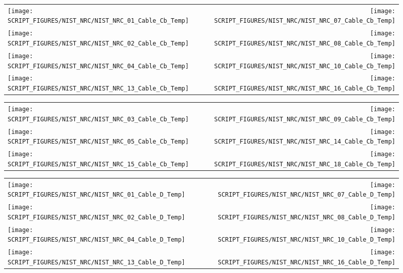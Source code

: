 \begin{figure}[p]
\begin{tabular*}{\textwidth}{l@{\extracolsep{\fill}}r}
\texttt{[image: SCRIPT\_FIGURES/NIST\_NRC/NIST\_NRC\_01\_Cable\_Cb\_Temp]} &
\texttt{[image: SCRIPT\_FIGURES/NIST\_NRC/NIST\_NRC\_07\_Cable\_Cb\_Temp]} \\
\texttt{[image: SCRIPT\_FIGURES/NIST\_NRC/NIST\_NRC\_02\_Cable\_Cb\_Temp]} &
\texttt{[image: SCRIPT\_FIGURES/NIST\_NRC/NIST\_NRC\_08\_Cable\_Cb\_Temp]} \\
\texttt{[image: SCRIPT\_FIGURES/NIST\_NRC/NIST\_NRC\_04\_Cable\_Cb\_Temp]} &
\texttt{[image: SCRIPT\_FIGURES/NIST\_NRC/NIST\_NRC\_10\_Cable\_Cb\_Temp]} \\
\texttt{[image: SCRIPT\_FIGURES/NIST\_NRC/NIST\_NRC\_13\_Cable\_Cb\_Temp]} &
\texttt{[image: SCRIPT\_FIGURES/NIST\_NRC/NIST\_NRC\_16\_Cable\_Cb\_Temp]}
\end{tabular*}
\label{NIST_NRC_Cable_Cb_Closed}
\end{figure}

\begin{figure}[p]
\begin{tabular*}{\textwidth}{l@{\extracolsep{\fill}}r}
\texttt{[image: SCRIPT\_FIGURES/NIST\_NRC/NIST\_NRC\_03\_Cable\_Cb\_Temp]} &
\texttt{[image: SCRIPT\_FIGURES/NIST\_NRC/NIST\_NRC\_09\_Cable\_Cb\_Temp]} \\
\texttt{[image: SCRIPT\_FIGURES/NIST\_NRC/NIST\_NRC\_05\_Cable\_Cb\_Temp]} &
\texttt{[image: SCRIPT\_FIGURES/NIST\_NRC/NIST\_NRC\_14\_Cable\_Cb\_Temp]} \\
\texttt{[image: SCRIPT\_FIGURES/NIST\_NRC/NIST\_NRC\_15\_Cable\_Cb\_Temp]} &
\texttt{[image: SCRIPT\_FIGURES/NIST\_NRC/NIST\_NRC\_18\_Cable\_Cb\_Temp]}
\end{tabular*}
\label{NIST_NRC_Cable_Cb_Open}
\end{figure}

\begin{figure}[p]
\begin{tabular*}{\textwidth}{l@{\extracolsep{\fill}}r}
\texttt{[image: SCRIPT\_FIGURES/NIST\_NRC/NIST\_NRC\_01\_Cable\_D\_Temp]} &
\texttt{[image: SCRIPT\_FIGURES/NIST\_NRC/NIST\_NRC\_07\_Cable\_D\_Temp]} \\
\texttt{[image: SCRIPT\_FIGURES/NIST\_NRC/NIST\_NRC\_02\_Cable\_D\_Temp]} &
\texttt{[image: SCRIPT\_FIGURES/NIST\_NRC/NIST\_NRC\_08\_Cable\_D\_Temp]} \\
\texttt{[image: SCRIPT\_FIGURES/NIST\_NRC/NIST\_NRC\_04\_Cable\_D\_Temp]} &
\texttt{[image: SCRIPT\_FIGURES/NIST\_NRC/NIST\_NRC\_10\_Cable\_D\_Temp]} \\
\texttt{[image: SCRIPT\_FIGURES/NIST\_NRC/NIST\_NRC\_13\_Cable\_D\_Temp]} &
\texttt{[image: SCRIPT\_FIGURES/NIST\_NRC/NIST\_NRC\_16\_Cable\_D\_Temp]}
\end{tabular*}
\label{NIST_NRC_Cable_D_Closed}
\end{figure}

